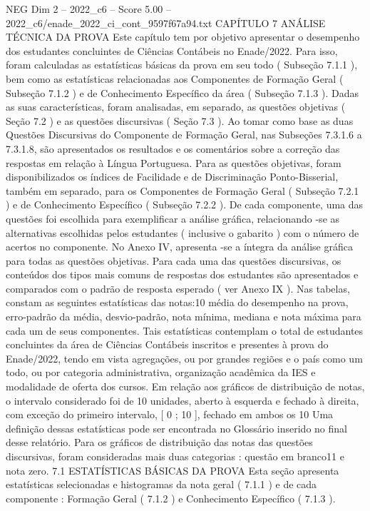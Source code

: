 \begin{textsample}{NEG Dim 2 – 2022\_c6 – Score 5.00 – 2022\_c6/enade\_2022\_ci\_cont\_9597f67a94.txt}  \label{ex:f2_neg_302}
CAPÍTULO 7 ANÁLISE TÉCNICA DA PROVA Este capítulo tem por objetivo apresentar o desempenho dos estudantes concluintes de Ciências Contábeis no Enade/2022.
Para isso, foram calculadas as estatísticas básicas da prova em seu todo ( Subseção 7.1.1 ), bem como as estatísticas relacionadas aos Componentes de Formação Geral ( Subseção 7.1.2 ) e de Conhecimento Específico da área ( Subseção 7.1.3 ).
Dadas as suas características, foram analisadas, em separado, as questões objetivas ( Seção 7.2 ) e as questões discursivas ( Seção 7.3 ).
Ao tomar como base as duas Questões Discursivas do Componente de Formação Geral, nas Subseções 7.3.1.6 a 7.3.1.8, são apresentados os resultados e os comentários sobre a correção das respostas em relação à Língua Portuguesa.
Para as questões objetivas, foram disponibilizados os índices de Facilidade e de Discriminação Ponto-Bisserial, também em separado, para os Componentes de Formação Geral ( Subseção 7.2.1 ) e de Conhecimento Específico ( Subseção 7.2.2 ).
De cada componente, uma das questões foi escolhida para exemplificar a análise gráfica, relacionando -se as alternativas escolhidas pelos estudantes ( inclusive o gabarito ) com o número de acertos no componente.
No Anexo IV, apresenta -se a íntegra da análise gráfica para todas as questões objetivas.
Para cada uma das questões discursivas, os conteúdos dos tipos mais comuns de respostas dos estudantes são apresentados e comparados com o padrão de resposta esperado ( ver Anexo IX ).
Nas tabelas, constam as seguintes estatísticas das notas:10 média do desempenho na prova, erro-padrão da média, desvio-padrão, nota mínima, mediana e nota máxima para cada um de seus componentes.
Tais estatísticas contemplam o total de estudantes concluintes da área de Ciências Contábeis inscritos e presentes à prova do Enade/2022, tendo em vista agregações, ou por grandes regiões e o país como um todo, ou por categoria administrativa, organização acadêmica da IES e modalidade de oferta dos cursos.
Em relação aos gráficos de distribuição de notas, o intervalo considerado foi de 10 unidades, aberto à esquerda e fechado à direita, com exceção do primeiro intervalo, [ 0 ; 10 ], fechado em ambos os 10 Uma definição dessas estatísticas pode ser encontrada no Glossário inserido no final desse relatório.
Para os gráficos de distribuição das notas das questões discursivas, foram consideradas mais duas categorias : questão em branco11 e nota zero. 7.1 ESTATÍSTICAS BÁSICAS DA PROVA Esta seção apresenta estatísticas selecionadas e histogramas da nota geral ( 7.1.1 ) e de cada componente : Formação Geral ( 7.1.2 ) e Conhecimento Específico ( 7.1.3 ).

\end{textsample}
